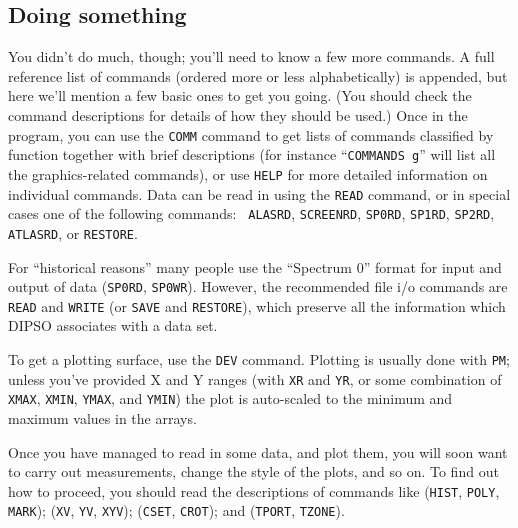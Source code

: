 \documentclass[twoside,11pt]{article}
\newcommand{\htmlref}[2]{#1}
\renewcommand{\_}{\texttt{\symbol{95}}}
\begin{document}
\subsection {Doing something}

You didn't do much, though; you'll need to know a few more commands. A
\htmlref{full reference list of commands}{APP:FULL} (ordered more or less
alphabetically) is appended, but here we'll mention a few basic ones to
get you going. (You should check the command descriptions for details of
how they should be used.)
Once in the program, you can use the \htmlref{{\tt{COMM}}}{COM:COMMANDS} 
command to get lists of commands classified by function together with
brief descriptions (for instance ``\verb+COMMANDS g+'' will list all the
graphics-related commands), or use \htmlref{{\tt{HELP}}}{COM:HELP}  for
more detailed information on individual commands.
Data can be read in using the \htmlref{{\tt{READ}}}{COM:READ}  command, or
in special cases one of the following commands: \htmlref{{\tt
ALASRD}}{COM:ALASRD}, \htmlref{{\tt{SCREENRD}}}{COM:SCREENRD}, 
\htmlref{{\tt{SP0RD}}}{COM:SP0RD},  \htmlref{{\tt{SP1RD}}}{COM:SP1RD}, 
\htmlref{{\tt{SP2RD}}}{COM:SP2RD},  \htmlref{{\tt{ATLASRD}}}{COM:ATLASRD}, 
or \htmlref{{\tt{RESTORE}}}{COM:RESTORE}. 

For ``historical reasons'' many people use the ``Spectrum 0'' format
for input and output of data (\htmlref{{\tt{SP0RD}}}{COM:SP0RD},  \htmlref{{\tt{SP0WR}}}{COM:SP0WR}).  However, the
recommended file i/o commands are \htmlref{{\tt{READ}}}{COM:READ}  and \htmlref{{\tt{WRITE}}}{COM:WRITE}  (or
\htmlref{{\tt{SAVE}}}{COM:SAVE}  and \htmlref{{\tt{RESTORE}}}{COM:RESTORE}),  which preserve all the information which
DIPSO associates with a data set.

To get a plotting surface, use the \htmlref{{\tt{DEV}}}{COM:DEV}  command. Plotting is
usually done with \htmlref{{\tt{PM}}}{COM:PM};  unless you've provided X and Y ranges
(with \htmlref{{\tt{XR}}}{COM:XR}  and \htmlref{{\tt{YR}}}{COM:YR},  or some combination of \htmlref{{\tt{XMAX}}}{COM:XMAX}, 
\htmlref{{\tt{XMIN}}}{COM:XMIN},  \htmlref{{\tt{YMAX}}}{COM:YMAX},  and \htmlref{{\tt{YMIN}}}{COM:YMIN})  the plot is auto-scaled to the
minimum and maximum values in the arrays.

Once you have managed to read in some data, and plot them, you will
soon want to carry out measurements, change the style of the plots,
and so on. To find out how to proceed, you should read the
descriptions of commands like (\htmlref{{\tt{HIST}}}{COM:HIST},  \htmlref{{\tt{POLY}}}{COM:POLY},  \htmlref{{\tt{MARK}}}{COM:MARK}); 
(\htmlref{{\tt{XV}}}{COM:XV},  \htmlref{{\tt{YV}}}{COM:YV},  \htmlref{{\tt{XYV}}}{COM:XYV});  (\htmlref{{\tt{CSET}}}{COM:CSET},  \htmlref{{\tt{CROT}}}{COM:CROT}); 
and (\htmlref{{\tt{TPORT}}}{COM:TPORT},  \htmlref{{\tt{TZONE}}}{COM:TZONE}). 
\end{document}
